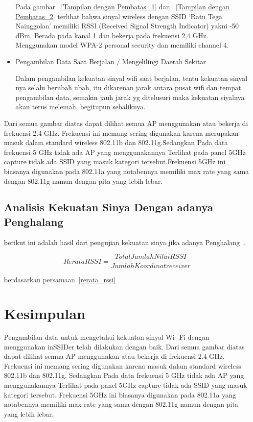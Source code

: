 \documentclass[conference]{IEEEtran}
\begin{document}
\begin{itemize}
\vspace{0.2cm}

Pada gambar ~\ref{Tampilan dengan Pembatas_1} dan ~\ref{Tampilan dengan Pembatas_2} terlihat bahwa sinyal wireless
dengan SSID ‘Ratu Tega Nainggolan’ memiliki RSSI (Received Signal Strength Indicator) yakni -50 dBm.
Berada pada kanal 1 dan bekerja pada frekuensi 2,4
GHz. Menggunakan model WPA-2 personal security dan
memiliki channel 4.
\vspace{0.2cm}

    \item Pengambilan Data Saat Berjalan / Mengelilingi Daerah
    Sekitar

\vspace{0.2cm}

Dalam pengambilan kekuatan sinyal wifi saat berjalan,
tentu kekuatan sinyal nya selalu berubah ubah, itu
dikarenan jarak antara pusat wifi dan tempat pengambilan
data, semakin jauh jarak yg ditelusuri maka kekuatan
siyalnya akan terus melemah, begitupun sebaliknya.
\end{itemize}

\vspace{0.2cm}
Dari semua gambar diatas dapat dilihat semua AP menggunakan
atau bekerja di frekuensi 2.4 GHz. Frekuensi
ini memang sering digunakan karena merupakan masuk
dalam standard wireless 802.11b dan 802.11g.Sedangkan
Pada data frekuensi 5 GHz tidak ada AP yang
menggunakannya Terlihat pada panel 5GHz capture
tidak ada SSID yang masuk kategori tersebut.Frekuensi
5GHz ini biasanya digunakan pada 802.11a yang notabennya
memiliki max rate yang sama dengan 802.11g
namun dengan pita yang lebih lebar.

\subsection{Analisis Kekuatan Sinya Dengan adanya Penghalang}
berikut ini adalah hasil dari pengujian kekuatan sinya jika adanya Penghalang~. \cite{b6}

\begin{equation}
    Rerata RSSI = \frac{Total Jumlah Nilai RSSI}{Jumlah Koordinat receiver}
    \label{rerata_rssi}
\end{equation}

berdasarkan persamaan~\ref{rerata_rssi}

\section{Kesimpulan}
Pengambilan data untuk mengetahui kekuatan sinyal Wi-
Fi dengan menggunakan inSSIDer telah dilakukan dengan
baik. Dari semua gambar diatas dapat dilihat semua AP
menggunakan atau bekerja di frekuensi 2.4 GHz. Frekuensi ini
memang sering digunakan karena masuk dalam standard wireless
802.11b dan 802.11g. Sedangkan Pada data frekuensi 5 GHz tidak ada AP yang menggunakannya Terlihat pada panel
5GHz capture tidak ada SSID yang masuk kategori tersebut.
Frekuensi 5GHz ini biasanya digunakan pada 802.11a yang
notabennya memiliki max rate yang sama dengan 802.11g
namun dengan pita yang lebih lebar.
\end{document}
